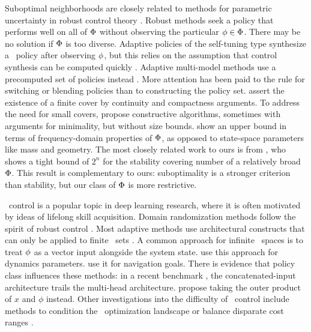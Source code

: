 
Suboptimal neighborhoods are closely related to methods for parametric uncertainty
in robust control theory
\citep{dullerud-robust}.
Robust methods seek a policy
that performs well on all of $\Phi$
without observing the particular ${\phi \in \Phi}$.
There may be no solution if $\Phi$ is too diverse.
Adaptive policies
of the self-tuning type
synthesize a \singleenv\ policy after observing $\phi$,
but this relies on the assumption that control synthesis can be computed quickly
\citep{astrom-adaptive}.
Adaptive multi-model methods use a precomputed set of policies instead
\citep{murray-smith-multimodel}.
More attention has been paid to
the rule for switching or blending policies
than to constructing the policy set.
\citet{fu-adaptive-switching,stilwell-interpolation,yoon-gain-scheduling-minimax}
assert the existence of a finite cover
by continuity and compactness arguments.
To address the need for small covers,
\citet{anderson-coverings,mcnichols-selecting-discrete,tan-selecting,fekri-issues,du-multimodel-integrated}
propose constructive algorithms, %
sometimes with arguments for minimality,
but without size bounds.
\citet{jalali-multimodel-vinnicombe}
show an upper bound in terms of frequency-domain properties of $\Phi$,
as opposed to state-space parameters like mass and geometry.
The most closely related work to ours is from \citet{fu-minimum-switching},
who shows a tight bound of $2^n$
for the stability covering number
of a relatively broad $\Phi$. %
This result is complementary to ours:
suboptimality is a stronger criterion than stability,
but our class of $\Phi$ is more restrictive.

\Multienv\ control is a popular topic in deep learning research,
where it is often motivated by ideas of lifelong skill acquisition.
Domain randomization methods
follow the spirit of robust control
\citep{peng-dynamics-randomization-corr17}.
Most adaptive methods use architectural constructs that can only be applied to finite \envword\ sets
\citep{yang-multitask,parisotto-actormimic,devin-modular}.
A common approach for infinite \envword\ spaces is to treat $\phi$ as a vector input alongside the system state.
\citet{yu-up-osi-rss17,chen-hardware-conditioned}
use this approach for dynamics parameters.
\citet{schaul-uvfa} use it for navigation goals.
There is evidence that policy class influences these methods:
in a recent benchmark %
\citep{yu-metaworld},
the concatenated-input architecture
trails the multi-head architecture.
\citet{florensa-stochasticnn}
propose taking the outer product of $x$ and $\phi$ instead.
Other investigations into the difficulty of \multienv\ control include
methods to condition the \multienv\ optimization landscape
\citep{yu-pcgrad}
or balance disparate cost ranges
\citep{hasselt-popart}.

